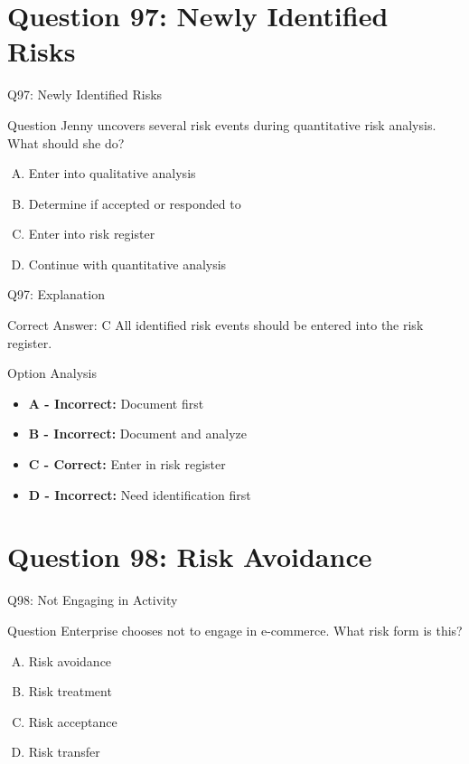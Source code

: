 \documentclass{beamer}
\begin{document}
	\section{Question 97: Newly Identified Risks}
	
	\begin{frame}{Q97: Newly Identified Risks}
		\begin{block}{Question}
			Jenny uncovers several risk events during quantitative risk analysis. What should she do?
		\end{block}
		\begin{enumerate}[(A)]
			\item Enter into qualitative analysis
			\item Determine if accepted or responded to
			\item Enter into risk register
			\item Continue with quantitative analysis
		\end{enumerate}
	\end{frame}
	
	\begin{frame}{Q97: Explanation}
		\begin{block}{Correct Answer: C}
			All identified risk events should be entered into the risk register.
		\end{block}
		\begin{block}{Option Analysis}
			\begin{itemize}
				\item \textbf{A - Incorrect:} Document first
				\item \textbf{B - Incorrect:} Document and analyze
				\item \textbf{C - Correct:} Enter in risk register
				\item \textbf{D - Incorrect:} Need identification first
			\end{itemize}
		\end{block}
	\end{frame}
	
	\section{Question 98: Risk Avoidance}
	
	\begin{frame}{Q98: Not Engaging in Activity}
		\begin{block}{Question}
			Enterprise chooses not to engage in e-commerce. What risk form is this?
		\end{block}
		\begin{enumerate}[(A)]
			\item Risk avoidance
			\item Risk treatment
			\item Risk acceptance
			\item Risk transfer
		\end{enumerate}
	\end{frame}
	
\end{document}
